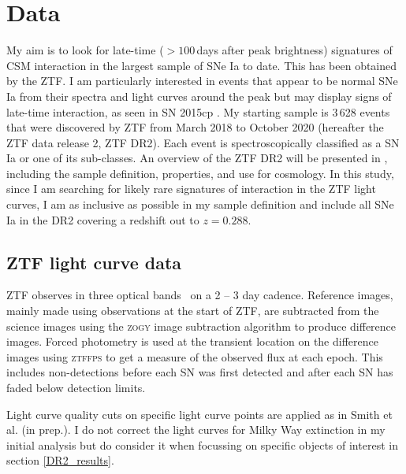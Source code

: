 \documentclass[a4paper,oneside,12pt, class=Latex/Classes/PhDthesisPSnPDF, crop=false]{standalone}
\begin{document}
\section{Data}
\label{DR2_data}
My aim is to look for late-time ($>100$\,days after peak brightness) signatures of CSM interaction in the largest sample of SNe Ia to date. This has been obtained by the ZTF. I am particularly interested in events that appear to be normal SNe Ia from their spectra and light curves around the peak but may display signs of late-time interaction, as seen in SN 2015cp \citep{2015cp}. My starting sample is 3\,628 events that were discovered by ZTF from March 2018 to October 2020 (hereafter the ZTF data release 2, ZTF DR2). Each event is spectroscopically classified as a SN Ia or one of its sub-classes. An overview of the ZTF DR2 will be presented in \citet{DR2_Overview}, including the sample definition, properties, and use for cosmology. In this study, since I am searching for likely rare signatures of interaction in the ZTF light curves, I am as inclusive as possible in my sample definition and include all SNe Ia in the DR2 covering a redshift out to $z = 0.288$. 

\subsection{ZTF light curve data}
\label{lc_data}
ZTF observes in three optical bands \ztfg\ztfr\ztfi\ on a 2 -- 3 day cadence. Reference images, mainly made using observations at the start of ZTF, are subtracted from the science images using the \textsc{zogy} image subtraction algorithm \citep{ZOGY} to produce difference images. Forced photometry is used at the transient location on the difference images using \textsc{ztffps} \citep{ztffps} to get a measure of the observed flux at each epoch. This includes non-detections before each SN was first detected and after each SN has faded below detection limits.

Light curve quality cuts on specific light curve points are applied as in Smith et al. (in prep.). I do not correct the light curves for Milky Way extinction in my initial analysis but do consider it when focussing on specific objects of interest in section \ref{DR2_results}. 
\end{document}
